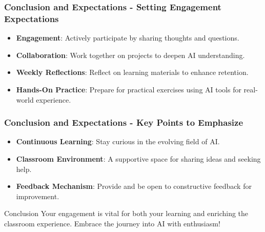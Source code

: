 \documentclass[aspectratio=169]{beamer}
\begin{document}
\begin{frame}[fragile]
    \frametitle{Conclusion and Expectations - Setting Engagement Expectations}
    \begin{itemize}
        \item \textbf{Engagement}: Actively participate by sharing thoughts and questions.
        
        \item \textbf{Collaboration}: Work together on projects to deepen AI understanding.
        
        \item \textbf{Weekly Reflections}: Reflect on learning materials to enhance retention.
        
        \item \textbf{Hands-On Practice}: Prepare for practical exercises using AI tools for real-world experience.
    \end{itemize}
\end{frame}

\begin{frame}[fragile]
    \frametitle{Conclusion and Expectations - Key Points to Emphasize}
    \begin{itemize}
        \item \textbf{Continuous Learning}: Stay curious in the evolving field of AI.
        
        \item \textbf{Classroom Environment}: A supportive space for sharing ideas and seeking help.
        
        \item \textbf{Feedback Mechanism}: Provide and be open to constructive feedback for improvement.
    \end{itemize}
    
    \begin{block}{Conclusion}
        Your engagement is vital for both your learning and enriching the classroom experience. Embrace the journey into AI with enthusiasm!
    \end{block}
\end{frame}
\end{document}
